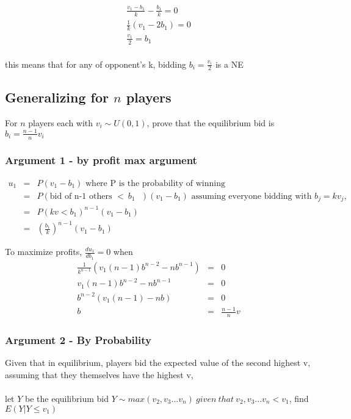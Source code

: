 \documentclass[10pt, a4paper]{article}
\begin{document}
\begin{align*}
\frac{v_1 - b_1}{k} - \frac{b_1}{k}  = 0 \\
\frac{1}{k}(v_1 - 2b_1) = 0 \\
\frac{v_1}{2}  = {b_1} \\
\end{align*}

this means that for any of opponent's k, bidding $b_i = \frac{v_i}{2}$ is a NE

\subsection{Generalizing for $n$ players}
For $n$ players each with $v_i \sim U(0, 1)$, prove that the equilibrium bid is $b_i = \frac{n-1}{n}v_i$ \\

\subsubsection{Argument 1 - by profit max argument}
\begin{eqnarray}
u_1 & = & P(v_1 - b_1) \text{ where P is the probability of winning} \nonumber \\
& = & P(\text{bid of n-1 others $<\ b_1$ })(v_1 - b_1) \nonumber 
\text{ assuming everyone bidding with $b_j = kv_j$, } \\
& = & P(kv < b_1)^{n-1}(v_1 - b_1) \nonumber \\
& = &(\frac{b_1}{k})^{n-1}(v_1 - b_1)\nonumber
\end{eqnarray}

To maximize profits, $\frac{du_1}{db_1} = 0$ when
\begin{eqnarray}
   \frac{1}{k^{n-1}} (v_1(n-1)b^{n-2} - nb^{n-1}) & = & 0 \nonumber \\
   v_1(n-1)b^{n-2} - nb^{n-1} & = & 0 \nonumber \\
   b^{n-2} (v_1(n-1) - nb) & = & 0 \nonumber \\
   b & = & \frac{n-1}{n}v \nonumber
\end{eqnarray}

\subsubsection{Argument 2 - By Probability}
Given that in equilibrium, players bid the expected value of the second highest v, assuming that they themselves have the highest v, \\ \\
let $Y$ be the equilibrium bid $Y \sim max(v_2, v_3 ... v_n)\ given\ that\ v_2, v_3 ... v_n < v_1$, find $E(Y|Y \le v_1)$ \\
\end{document}
